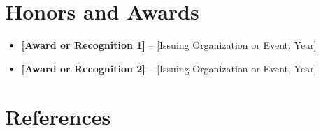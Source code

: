 \documentclass[11pt,a4paper,sans]{moderncv}
\begin{document}
\section{Honors and Awards}
\begin{itemize}
\item \textbf{[Award or Recognition 1]} -- [Issuing Organization or Event, Year]
\item \textbf{[Award or Recognition 2]} -- [Issuing Organization or Event, Year]
\end{itemize}

\section{References}
\end{document}
